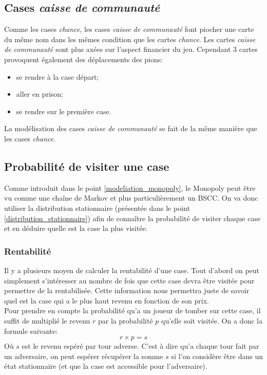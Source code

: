 \documentclass[letterpaper]{article}
\begin{document}
  \subsection{Cases \textit{caisse de communauté}}
    Comme les cases \textit{chance}, les cases \textit{caisse de
    communauté} font piocher une carte du même nom dans les mêmes
    condition que les cartes \textit{chance}.  Les cartes
    \textit{caisse de communauté} sont plus axées sur l'aspect
    financier du jeu. Cependant 3 cartes provoquent également des
    déplacements des pions:
    \begin{itemize}
     \item se rendre à la case départ;
     \item aller en prison;
     \item se rendre sur le première case.
    \end{itemize}
    La modélisation des cases \textit{caisse de communauté} se fait de la
    même manière que les cases \textit{chance}.

  \subsection{Probabilité de visiter une case}
    Comme introduit dans le point \ref{modeliation_monopoly}, le Monopoly
    peut être vu comme une chaîne de Markov et plus particulièrement un
    BSCC.  On va donc utiliser la distribution stationnaire (présentée dans
    le point \ref{distribution_stationnaire}) afin de connaître la
    probabilité de visiter chaque case et en déduire quelle est la case la
    plus visitée.

  \subsubsection{Rentabilité}
    \label{rentabilite}
    Il y a plusieurs moyen de calculer la rentabilité d'une case.  Tout
    d'abord on peut simplement s'intéresser au nombre de fois que cette case
    devra être visitée pour permettre de la rentabilisée.  Cette information
    nous permettra juste de savoir quel est la case qui a le plus haut revenu en
    fonction de son prix.\\
    Pour prendre en compte la probabilité qu'a un joueur de tomber sur cette
    case, il suffit de multiplié le revenu $r$ par la probabilité $p$ qu'elle soit
    visitée.  On a donc la formule suivante:
    $$r \times p = s$$
    Où $s$ est le revenu espéré par tour adverse.  C'est à dire qu'a chaque tour
    fait par un adversaire, on peut espérer récupérer la somme $s$ si l'on
    considère être dans un état stationnaire (et que la case est accessible
    pour l'adversaire).
\end{document}
